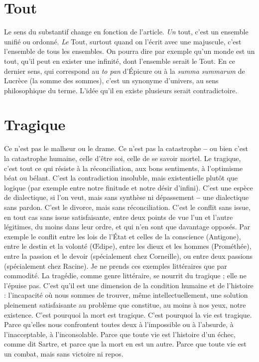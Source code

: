 \section{Tout}
Le sens du substantif change en fonction de l’article. {\it Un} tout, c’est
un ensemble unifié ou ordonné. {\it Le} Tout, surtout quand on l'écrit
avec une majuscule, c’est l’ensemble de tous les ensembles. On pourra dire par
exemple qu’un monde est un tout, qu’il peut en exister une infinité, dont
l’ensemble serait le Tout. En ce dernier sens, qui correspond au {\it to pan} d’Épicure
ou à la {\it summa summarum} de Lucrèce (la somme des sommes), c’est un
synonyme d’univers, au sens philosophique du terme. L'idée qu’il en existe plusieurs
serait contradictoire.

\section{Tragique}
Ce n’est pas le malheur ou le drame. Ce n’est pas la catastrophe
{\bf --} ou bien c’est la catastrophe humaine, celle d’être soi, celle de
se savoir mortel. Le tragique, c’est tout ce qui résiste à la réconciliation, aux
bons sentiments, à l’optimisme béat ou bélant. C’est la contradiction insoluble,
mais existentielle plutôt que logique (par exemple entre notre finitude et notre
désir d’infini). C’est une espèce de dialectique, si l’on veut, mais sans synthèse
ni dépassement {\bf --} une dialectique sans pardon. C’est le divorce, mais sans
réconciliation. C’est le conflit sans issue, en tout cas sans issue satisfaisante,
entre deux points de vue l’un et l’autre légitimes, du moins dans leur ordre, et
qui n’en sont que davantage opposés. Par exemple le conflit entre les lois de
l’État et celles de la conscience (Antigone), entre le destin et la volonté
(Œdipe), entre les dieux et les hommes (Prométhée), entre la passion et le
devoir (spécialement chez Corneille), ou entre deux passions (spécialement
chez Racine). Je ne prends ces exemples littéraires que par commodité. La
tragédie, comme genre littéraire, se nourrit du tragique ; elle ne l’épuise pas.
C’est qu’il est une dimension de la condition humaine et de l’histoire : l’incapacité
où nous sommes de trouver, même intellectuellement, une solution pleinement
satisfaisante au problème que constitue, au moins à nos yeux, notre
existence. C’est pourquoi la mort est tragique. C’est pourquoi la vie est tragique.
Parce qu'elles nous confrontent toutes deux à l'impossible ou à
l'absurde, à l’inacceptable, à l’inconsolable. Parce que toute vie est l’histoire
d’un échec, comme dit Sartre, et parce que la mort en est un autre. Parce que
toute vie est un combat, mais sans victoire ni repos.

